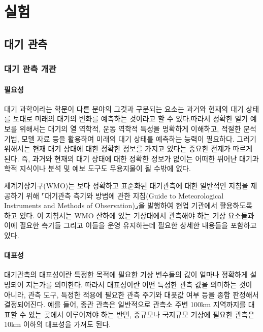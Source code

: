 
\part{실험}

\chapter{대기 관측}


\section{대기 관측 개관}

\subsection{필요성}

대기 과학이라는 학문이 다른 분야의 그것과 구분되는 요소는 과거와 현재의 대기 상태를 토대로 미래의 대기의 변화를 예측하는 것이라고 할 수 있다.따라서 정확한 일기 예보를 위해서는 대기의 열 역학적, 운동 역학적 특성을 명확하게 이해하고, 적절한 분석 기법, 모델 자료 등을 활용하여 미래의 대기 상태를 예측하는 능력이 필요하다. 그러기 위해서는 현재 대기 상태에 대한 정확한 정보를 가지고 있다는 중요한 전제가 따르게 된다. 즉, 과거와 현재의 대기 상태에 대한 정확한 정보가 없이는 어떠한 뛰어난 대기과학적 지식이나 분석 및 예보 도구도 무용지물이 될 수밖에 없다.

세계기상기구(WMO)는 보다 정확하고 표준화된 대기관측에 대한 일반적인 지침을 제공하기 위해 ⌜대기관측 측기와 방법에 관한 지침(Guide to Meteorological Instruments and Methods of Observation)⌟을 발행하여 현업 기관에서 활용하도록 하고 있다. 이 지침서는 WMO 산하에 있는 기상대에서 관측해야 하는 기상 요소들과 이에 필요한 측기들 그리고 이들을 운영 유지하는데 필요한 상세한 내용들을 포함하고 있다. 

\subsection{대표성}

대기관측의 대표성이란 특정한 목적에 필요한 기상 변수들의 값이 얼마나 정확하게 설명되어 지는가를 의미한다. 따라서 대표성이란 어떤 특정한 관측 값을 의미하는 것이 아니라, 관측 도구, 특정한 적용에 필요한 관측 주기와 대푯값 여부 등을 종합 판정해서 결정되어진다. 예를 들어, 종관 관측은 일반적으로 관측소 주변 100km 지역까지를 대표할 수 있는 곳에서 이루어져야 하는 반면, 중규모나 국지규모 기상에 필요한 관측은 10km 이하의 대표성을 가져도 된다.

